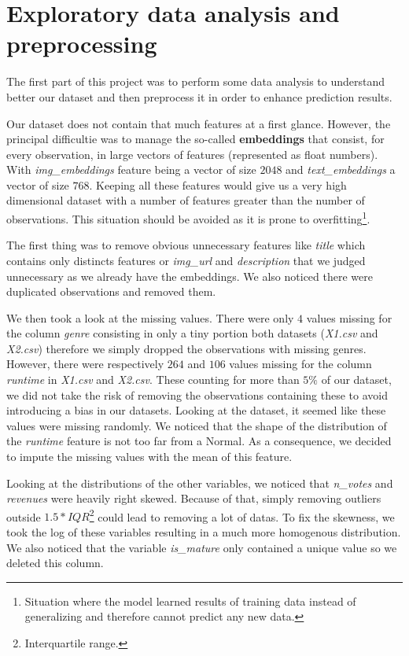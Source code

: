 \section{Exploratory data analysis and preprocessing}

The first part of this project was to perform some data analysis to understand better our dataset and then preprocess it in order to enhance prediction results.

Our dataset does not contain that much features at a first glance. However, the principal difficultie was to manage the so-called \textbf{embeddings} that consist, for every observation, in large vectors of features (represented as float numbers). With \textit{img\_embeddings} feature being a vector of size $2048$ and \textit{text\_embeddings} a vector of size $768$. Keeping all these features would give us a very high dimensional dataset with a number of features greater than the number of observations. This situation should be avoided as it is prone to overfitting\footnote{Situation where the model learned results of training data instead of generalizing and therefore cannot predict any new data.}. 

The first thing was to remove obvious unnecessary features like \textit{title} which contains only distincts features or \textit{img\_url} and \textit{description} that we judged unnecessary as we already have the embeddings. We also noticed there were duplicated observations and removed them.

We then took a look at the missing values. There were only $4$ values missing for the column \textit{genre} consisting in only a tiny portion both datasets (\textit{X1.csv} and \textit{X2.csv}) therefore we simply dropped the observations with missing genres. However, there were respectively $264$ and $106$ values missing for the column \textit{runtime} in \textit{X1.csv} and \textit{X2.csv}. These counting for more than $5\%$ of our dataset, we did not take the risk of removing the observations containing these to avoid introducing a bias in our datasets. Looking at the dataset, it seemed like these values were missing randomly. We noticed that the shape of the distribution of the \textit{runtime} feature is not too far from a Normal. As a consequence, we decided to impute the missing values with the mean of this feature.

Looking at the distributions of the other variables, we noticed that \textit{n\_votes} and \textit{revenues} were heavily right skewed. Because of that, simply removing outliers outside $1.5 * IQR$\footnote{Interquartile range.} could lead to removing a lot of datas. To fix the skewness, we took the log of these variables resulting in a much more homogenous distribution. We also noticed that the variable \textit{is\_mature} only contained a unique value so we deleted this column.

